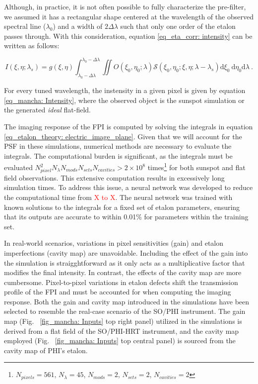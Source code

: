 Although, in practice, it is not often possible to fully characterize the pre-filter, we assumed it has a rectangular shape centered at the wavelength of the observed spectral line ($\lambda _ {0}$) and a width of $2\Delta \lambda$ such that only one order of the etalon passes through. With this consideration, equation \eqref{eq_eta_corr: intensity} can be written as follows:

\begin{equation}
  I\left(\xi, \eta ; \lambda_{s}\right)=g(\xi, \eta)\int_{\lambda _ 0 - \Delta \lambda}^{\lambda _ 0 - \Delta \lambda} \iint  O\left(\xi_0, \eta_0 ; \lambda\right)  \mathcal{S}\left(\xi_0, \eta_0; \xi , \eta; \lambda-\lambda_{s}\right)  \mathrm{d} \xi_{0} \mathrm{~d} \eta_{0}\mathrm{d} \lambda \ .
  \label{eq_mancha: Intensity}
\end{equation}

For every tuned wavelength, the instensity in a given pixel is given by equation \eqref{eq_mancha: Intensity}, where the observed object is the sunspot simulation or the generated \textit{ideal} flat-field. 

The imaging response of the FPI is computed by solving the integrals in equation \eqref{eq_etalon_theory: electric_image_plane}. Given that we will account for the PSF in these simulations, numerical methods are necessary to evaluate the integrals. The computational burden is significant, as the integrals must be evaluated $N_{pixel} ^2 N_{\lambda} N_{mods} N_{sets} N_{cavities} > 2\times10 ^8$ times\footnote{$N_{pixels} = 561$, $N_{\lambda} = 45$, $N_{mods} = 2$, $N_{sets} = 2$, $N_{cavities} = 2$} for both sunspot and flat field observations. This extensive computation results in excessively long simulation times. To address this issue, a neural network was developed to reduce the computational time from \textcolor{red}{X to X}. The neural network was trained with known solutions to the integrals for a fixed set of etalon parameters, ensuring that its outputs are accurate to within 0.01\% for parameters within the training set.

In real-world scenarios, variations in pixel sensitivities (gain) and etalon imperfections (cavity map) are unavoidable. Including the effect of the gain into the simulation is straigghtforward as it only acts as a multiplicative factor that modifies the final intensity. In contrast, the effects of the cavity map are more cumbersome. Pixel-to-pixel variations in etalon defects shift the transmission profile of the FPI and must be accounted for when computing the imaging response. Both the gain and cavity map introduced in the simulations have been selected to resemble the real-case scenario of the SO/PHI instrument. The gain map (Fig. ~\ref{fig_mancha: Inputs} top right panel) utilized in the simulations is derived from a flat field of the SO/PHI-HRT instrument, and the cavity map employed (Fig. ~\ref{fig_mancha: Inputs} top central panel) is sourced from the cavity map of PHI's etalon.


